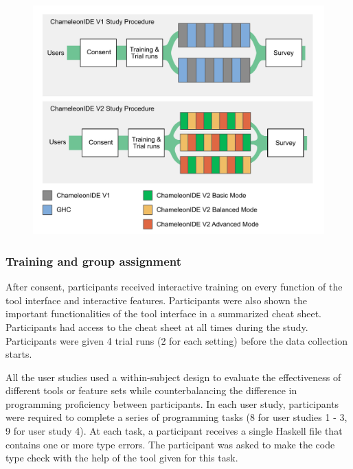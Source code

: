 \begin{figure}[h]
    \centering
    \includegraphics[width=\linewidth]{images/procedure.pdf}
    \caption{}
    \label{fig:study-process}
\end{figure}

\subsubsection*{\textbf{Training and group assignment}}
After consent, participants received interactive training on every function of the tool interface and interactive features. Participants were also shown the important functionalities of the tool interface in a summarized cheat sheet. Participants had access to the cheat sheet at all times during the study. Participants were given 4 trial runs (2 for each setting) before the data collection starts. 

All the user studies used a within-subject design to evaluate the effectiveness of different tools or feature sets while counterbalancing the difference in programming proficiency between participants. In each user study, participants were required to complete a series of programming tasks (8 for user studies 1 - 3, 9 for user study 4). At each task, a participant receives a single Haskell file that contains one or more type errors. The participant was asked to make the code type check with the help of the tool given for this task.




